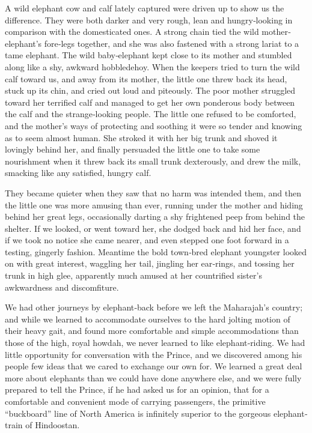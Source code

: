 \documentclass[12pt]{book}
\begin{document}
A wild elephant cow and calf lately captured were driven up to show us the
difference. They were both darker and very rough, lean and hungry‐looking in
comparison with the domesticated ones. A strong chain tied the wild mother‐elephant’s fore‐legs together, and she was also fastened with a strong lariat to a tame
elephant. The wild baby‐elephant kept close to its mother and stumbled along
like a shy, awkward hobbledehoy. When the keepers tried to turn the wild calf
toward us, and away from its mother, the little one threw back its head, stuck
up its chin, and cried out loud and piteously. The poor mother struggled toward
her terrified calf and managed to get her own ponderous body between the calf
and the strange‐looking people. The little one refused to be comforted, and the
mother’s ways of protecting and soothing it were so tender and knowing as to
seem almost human. She stroked it with her big trunk and shoved it lovingly
behind her, and finally persuaded the little one to take some nourishment when
it threw back its small trunk dexterously, and drew the milk, smacking like any
satisfied, hungry calf.

They became quieter when they saw that no harm was intended them, and
then the little one was more amusing than ever, running under the mother and
hiding behind her great legs, occasionally darting a shy frightened peep from
behind the shelter. If we looked, or went toward her, she dodged back and hid
her face, and if we took no notice she came nearer, and even stepped one foot
forward in a testing, gingerly fashion. Meantime the bold town‐bred elephant
youngster looked on with great interest, waggling her tail, jingling her ear‐rings,
and tossing her trunk in high glee, apparently much amused at her countrified
sister’s awkwardness and discomfiture.

We had other journeys by elephant‐back before we left the Maharajah’s country; and while we learned to accommodate ourselves to the hard jolting motion of
their heavy gait, and found more comfortable and simple accommodations than
those of the high, royal howdah, we never learned to like elephant‐riding. We had
little opportunity for conversation with the Prince, and we discovered among his
people few ideas that we cared to exchange our own for. We learned a great deal
more about elephants than we could have done anywhere else, and we were fully
prepared to tell the Prince, if he had asked us for an opinion, that for a comfortable
and convenient mode of carrying passengers, the primitive “buckboard” line of
North America is infinitely superior to the gorgeous elephant‐train of Hindoostan.
\end{document}
